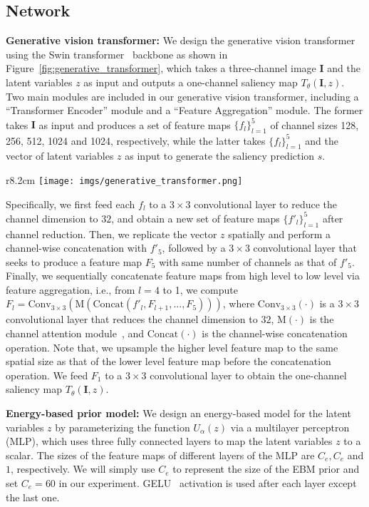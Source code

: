 \documentclass{article}
\begin{document}
\subsection{Network}\label{network_sec}


\noindent\textbf{Generative vision transformer:}
We design the generative vision transformer using the Swin transformer~\cite{liu2021swin} backbone as shown in Figure~\ref{fig:generative_transformer}, which takes a three-channel image $\textbf{I}$ and the latent variables $z$ as input and outputs a one-channel saliency map $T_\theta(\textbf{I},z)$. Two main modules are included in our generative vision transformer, including a \enquote{Transformer Encoder} module and a \enquote{Feature Aggregation} module. The former takes $\textbf{I}$ as input and produces a set of feature maps $\{f_l\}_{l=1}^5$ of channel sizes 128, 256, 512, 1024 and 1024, respectively, while the latter takes $\{f_l\}_{l=1}^5$ and the vector of latent variables $z$ as input to generate the saliency prediction $s$.
\begin{wrapfigure}{r}{8.2cm}
\centering
\texttt{[image: imgs/generative\_transformer.png]}
\caption{Generative latent variable vision transformer}
\label{fig:generative_transformer}
\end{wrapfigure}
Specifically, we first feed each $f_l$ to a $3\times3$ convolutional layer to reduce the channel dimension to $32$, and obtain a new set of feature maps $\{f'_l\}_{l=1}^5$ after channel reduction. Then, we replicate the vector $z$ spatially and perform a channel-wise concatenation with
$f'_5$, followed by a $3\times3$ convolutional layer that seeks to produce a feature map $F_5$ with same number of channels as that of $f'_5$.
Finally, we sequentially concatenate feature maps from  high level to low level via feature aggregation, i.e., from $l=4$ to 1, we compute $F_l=\text{Conv}_{3 \times 3}(\text{M}(\text{Concat}(f'_l,F_{l+1},...,F_5)))$,  where $\text{Conv}_{3 \times 3}(\cdot)$ is a $3\times3$ convolutional layer that reduces the channel dimension to $32$, $\text{M}(\cdot)$ is the channel attention module~\cite{rca_eccv}, and $\text{Concat}(\cdot)$ is the channel-wise concatenation operation. Note that, we upsample the higher level feature map to the same spatial size as that of the lower level feature map before the concatenation operation. We feed $F_1$ to a $3\times3$ convolutional layer to obtain
the one-channel saliency map $T_\theta(\textbf{I},z)$.




\noindent\textbf{Energy-based prior model:}
We design an energy-based model for the latent variables $z$ by parameterizing the function $U_{\alpha}(z)$ via a multilayer perceptron (MLP), which uses three fully connected layers to map the latent variables $z$ to a scalar. The sizes of the feature maps of different layers of the MLP are $C_e,C_e$ and $1$, respectively. We will simply use $C_e$ to represent the size of the EBM prior and set $C_e=60$ in our experiment. GELU~\cite{hendrycks2016gaussian} activation is used after each layer except the last one. 
\end{document}
